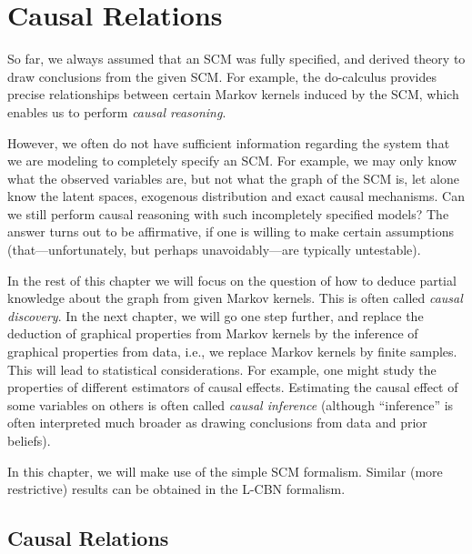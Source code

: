 \section{Causal Relations}

So far, we always assumed that an SCM was fully specified, and derived theory to 
draw conclusions from the given SCM. For example, the do-calculus provides precise
relationships between certain Markov kernels induced by the SCM,
which enables us to perform \emph{causal reasoning}.

However, we often do not have sufficient information regarding the system that
we are modeling to completely specify an SCM. For example, we may only know what
the observed variables are, but not what the graph of the SCM is, let alone know the
latent spaces, exogenous distribution and exact causal mechanisms. Can we still
perform causal reasoning with such incompletely specified models? The answer turns
out to be affirmative, if one is willing to make certain assumptions (that---unfortunately, but perhaps unavoidably---are 
typically untestable).

In the rest of this chapter we will focus on the question of how to deduce partial knowledge about
the graph from given Markov kernels. This is often called \emph{causal 
discovery}. In the next chapter, we will go one step further, and replace the deduction
of graphical properties from Markov kernels by the inference of graphical properties
from data, i.e., we replace Markov kernels by finite samples. This will lead to 
statistical considerations. For example, one might study the properties of 
different estimators of causal effects. Estimating the causal effect of some variables
on others is often called \emph{causal inference} (although ``inference'' is often
interpreted much broader as drawing conclusions from data and prior beliefs).

In this chapter, we will make use of the simple SCM formalism. 
Similar (more restrictive) results can be obtained in the L-CBN formalism.

\subsection{Causal Relations}

